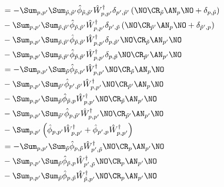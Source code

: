 \begin{appendix}
\begin{itemize}
\begin{align}
&=-\Sum_{p, p^\prime}\Sum_{\tilde p,\tilde p^\prime} \hat\phi_{\tilde p,\tilde p^\prime}\hat W_{p,p^\prime}^\dagger \delta_{p^\prime,\tilde p^\prime}\left(\NO\CR_{\tilde p}\AN_p\NO+\delta_{p,\tilde p}\right) \\
&-\Sum_{p, p^\prime}\Sum_{\tilde p,\tilde p^\prime} \hat\phi_{\tilde p,\tilde p^\prime}\hat W_{p,p^\prime}^\dagger \delta_{p^\prime,\tilde p}\left(\NO\CR_{\tilde p^\prime}\AN_p\NO+\delta_{\tilde p^\prime,p}\right) \nonumber\\
&-\Sum_{p, p^\prime}\Sum_{\tilde p,\tilde p^\prime} \hat\phi_{\tilde p,\tilde p^\prime}\hat W_{p,p^\prime}^\dagger \delta_{p,\tilde p^\prime}\NO\CR_{\tilde p}\AN_{p^\prime}\NO \nonumber\\
&-\Sum_{p, p^\prime}\Sum_{\tilde p,\tilde p^\prime} \hat\phi_{\tilde p,\tilde p^\prime}\hat W_{p,p^\prime}^\dagger \delta_{p,\tilde p}\NO\CR_{\tilde p^\prime}\AN_{p^\prime}\NO \nonumber\\
&=-\Sum_{p, p^\prime}\Sum_{\tilde p} \hat\phi_{\tilde p,p^\prime}\hat W_{p,p^\prime}^\dagger \NO\CR_{\tilde p}\AN_p\NO \\
&-\Sum_{p, p^\prime}\Sum_{\tilde p^\prime} \hat\phi_{p^\prime,\tilde p^\prime}\hat W_{p,p^\prime}^\dagger\NO\CR_{\tilde p^\prime}\AN_p\NO \nonumber\\
&-\Sum_{p, p^\prime}\Sum_{\tilde p} \hat\phi_{\tilde p,p}\hat W_{p,p^\prime}^\dagger \NO\CR_{\tilde p}\AN_{p^\prime}\NO \nonumber\\
&-\Sum_{p, p^\prime}\Sum_{\tilde p^\prime} \hat\phi_{p,\tilde p^\prime}\hat W_{p,p^\prime}^\dagger\NO\CR_{\tilde p^\prime}\AN_{p^\prime}\NO \nonumber\\
&-\Sum_{p, p^\prime}\left( \hat\phi_{ p, p^\prime}\hat W_{p,p^\prime}^\dagger+ \hat\phi_{p^\prime,p}\hat W_{p,p^\prime}^\dagger\right)\nonumber\\
&=-\Sum_{p, p^\prime}\Sum_{\tilde p} \hat\phi_{p,\tilde p}\hat W_{p^\prime,\tilde p}^\dagger \NO\CR_{p}\AN_{p^\prime}\NO \\
&-\Sum_{p, p^\prime}\Sum_{\tilde p} \hat\phi_{\tilde p,p}\hat W_{p^\prime,\tilde p}^\dagger\NO\CR_{p}\AN_{p^\prime}\NO \nonumber\\
&-\Sum_{p, p^\prime}\Sum_{\tilde p} \hat\phi_{p,\tilde p}\hat W_{\tilde p,p^\prime}^\dagger \NO\CR_{p}\AN_{p^\prime}\NO \nonumber\\

\end{align}
\end{itemize}
\end{appendix}
